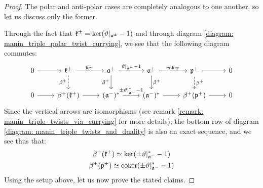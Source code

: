             \begin{proof}
                The polar and anti-polar cases are completely analogous to one another, so let us discuss only the former.

                Through the fact that $\mathfrak{k}^{\pm} = \ker(\vartheta|_{\mathfrak{a}^{\pm}} - 1)$ and through diagram \eqref{diagram: manin_triple_polar_twist_currying}, we see that the following diagram commutes:
                    \begin{equation} \label{diagram: manin_triple_twists_and_duality}
                        \begin{tikzcd}
                        	0 & {\k^+} & {\a^+} & {\a^+} & {\p^+} & 0 \\
                        	0 & {\beta^+(\k^+)} & {(\a^-)^*} & {(\a^-)^*} & {\beta^+(\p^+)} & 0
                        	\arrow[from=1-1, to=1-2]
                        	\arrow["\ker", from=1-2, to=1-3]
                        	\arrow["{\beta^+}"', dashed, from=1-2, to=2-2]
                        	\arrow["{\vartheta|_{\a^+} - 1}", from=1-3, to=1-4]
                        	\arrow["{\beta^+}"', from=1-3, to=2-3]
                        	\arrow["\coker", from=1-4, to=1-5]
                        	\arrow["{\beta^+}", from=1-4, to=2-4]
                        	\arrow[from=1-5, to=1-6]
                        	\arrow["{\beta^+}", dashed, from=1-5, to=2-5]
                        	\arrow[from=2-1, to=2-2]
                        	\arrow[from=2-2, to=2-3]
                        	\arrow["{\pm \vartheta|_{\a^-}^* - 1}", from=2-3, to=2-4]
                        	\arrow[from=2-4, to=2-5]
                        	\arrow[from=2-5, to=2-6]
                        \end{tikzcd}
                    \end{equation}
                Since the vertical arrows are isomorphisms (see remark \ref{remark: manin_triple_twists_via_currying} for more details), the bottom row of diagram \eqref{diagram: manin_triple_twists_and_duality} is also an exact sequence, and we see thus that:
                    $$
                        \begin{gathered}
                            \beta^+(\mathfrak{k}^+) \simeq \ker(\pm \vartheta|_{\mathfrak{a}^-}^* - 1)
                            \\
                            \beta^+(\mathfrak{p}^+) \simeq \operatorname{coker}(\pm \vartheta|_{\mathfrak{a}^-}^* - 1)
                        \end{gathered}
                    $$
                Using the setup above, let us now prove the stated claims.

\end{proof}
